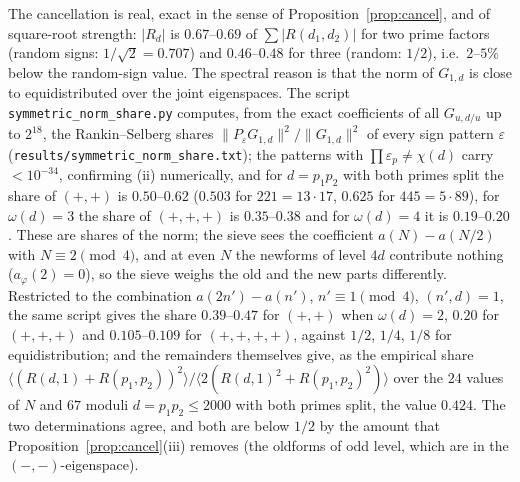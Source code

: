 \documentclass[11pt,a4paper]{article}
\theoremstyle{remark}
\theoremstyle{definition}
\newcommand{\e}{\varepsilon}
\begin{document}
The cancellation is real, exact in the sense of Proposition~\ref{prop:cancel}, and of square-root strength: $|R_d|$ is $0.67$--$0.69$ of $\sum|R(d_1,d_2)|$ for two prime factors (random signs: $1/\sqrt2=0.707$) and $0.46$--$0.48$ for three (random: $1/2$), i.e.\ $2$--$5\%$ below the random-sign value. The spectral reason is that the norm of $G_{1,d}$ is close to equidistributed over the joint eigenspaces. The script \texttt{symmetric\_norm\_share.py} computes, from the exact coefficients of all $G_{u,d/u}$ up to $2^{18}$, the Rankin--Selberg shares $\|P_\e G_{1,d}\|^2/\|G_{1,d}\|^2$ of every sign pattern $\e$ (\texttt{results/symmetric\_norm\_share.txt}); the patterns with $\prod\e_p\ne\chi(d)$ carry $<10^{-34}$, confirming (ii) numerically, and for $d=p_1p_2$ with both primes split the share of $(+,+)$ is $0.50$--$0.62$ ($0.503$ for $221=13\cdot17$, $0.625$ for $445=5\cdot89$), for $\omega(d)=3$ the share of $(+,+,+)$ is $0.35$--$0.38$ and for $\omega(d)=4$ it is $0.19$--$0.20$. These are shares of the norm; the sieve sees the coefficient $a(N)-a(N/2)$ with $N\equiv2\pmod4$, and at even $N$ the newforms of level $4d$ contribute nothing ($a_\varphi(2)=0$), so the sieve weighs the old and the new parts differently. Restricted to the combination $a(2n')-a(n')$, $n'\equiv1\pmod 4$, $(n',d)=1$, the same script gives the share $0.39$--$0.47$ for $(+,+)$ when $\omega(d)=2$, $0.20$ for $(+,+,+)$ and $0.105$--$0.109$ for $(+,+,+,+)$, against $1/2$, $1/4$, $1/8$ for equidistribution; and the remainders themselves give, as the empirical share $\langle(R(d,1)+R(p_1,p_2))^2\rangle/\langle2(R(d,1)^2+R(p_1,p_2)^2)\rangle$ over the $24$ values of $N$ and $67$ moduli $d=p_1p_2\le2000$ with both primes split, the value $0.424$. The two determinations agree, and both are below $1/2$ by the amount that Proposition~\ref{prop:cancel}(iii) removes (the oldforms of odd level, which are in the $(-,-)$-eigenspace).
\end{document}
